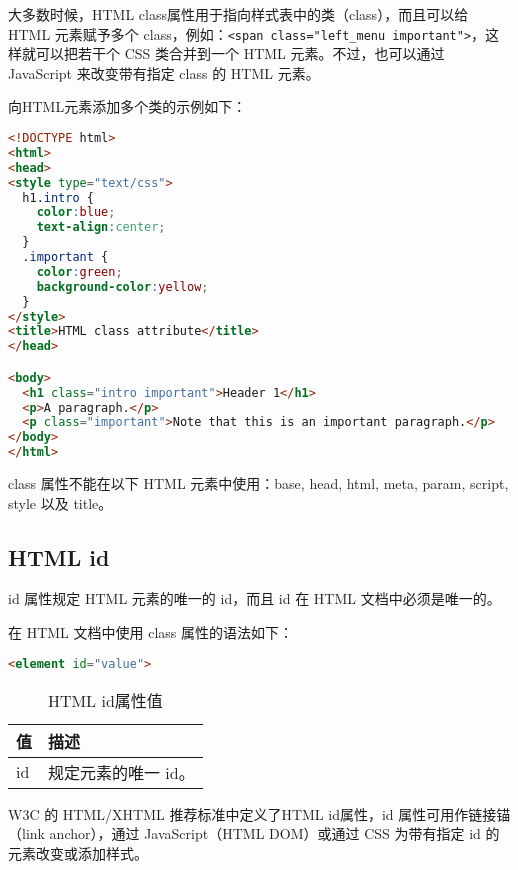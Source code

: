\vspace{-10pt}

大多数时候，HTML class属性用于指向样式表中的类（class），而且可以给 HTML 元素赋予多个 class，例如：\texttt{<span class="left\_menu important">}，这样就可以把若干个 CSS 类合并到一个 HTML 元素。不过，也可以通过 JavaScript 来改变带有指定 class 的 HTML 元素。



向HTML元素添加多个类的示例如下：

\begin{lstlisting}[language=HTML]
<!DOCTYPE html>
<html>
<head>
<style type="text/css">
  h1.intro {
    color:blue;
    text-align:center;
  }
  .important {
    color:green;
    background-color:yellow;
  }
</style>
<title>HTML class attribute</title>
</head>

<body>
  <h1 class="intro important">Header 1</h1>
  <p>A paragraph.</p>
  <p class="important">Note that this is an important paragraph.</p>
</body>
</html>
\end{lstlisting}

class 属性不能在以下 HTML 元素中使用：base, head, html, meta, param, script, style 以及 title。

\clearpage

\subsection{HTML id}

id 属性规定 HTML 元素的唯一的 id，而且 id 在 HTML 文档中必须是唯一的。

在 HTML 文档中使用 class 属性的语法如下：

\begin{lstlisting}[language=HTML]
<element id="value">
\end{lstlisting}

\begin{table}[!h]
\centering
\vspace{-10pt}
\caption{HTML id属性值}
\label{html_id_attribute}
\begin{tabular}{|m{40pt}|m{330pt}|}
\hline
值	&描述\\
\hline
id	&规定元素的唯一 id。\\
\hline
\end{tabular}
\end{table}

W3C 的 HTML/XHTML 推荐标准中定义了HTML id属性，id 属性可用作链接锚（link anchor），通过 JavaScript（HTML DOM）或通过 CSS 为带有指定 id 的元素改变或添加样式。

